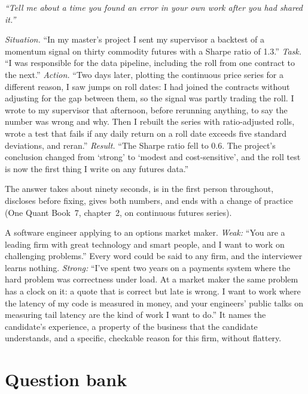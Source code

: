 \begin{example}\label{ex:iv:behavioural-and-fit:caught}
\emph{``Tell me about a time you found an error in your own work after you had shared it.''}

\emph{Situation.} ``In my master's project I sent my supervisor a backtest of a momentum signal on thirty commodity futures
with a Sharpe ratio of 1.3.'' \emph{Task.} ``I was responsible for the data pipeline, including the roll from one contract
to the next.'' \emph{Action.} ``Two days later, plotting the continuous price series for a different reason, I saw jumps on
roll dates: I had joined the contracts without adjusting for the gap between them, so the signal was partly trading the
roll. I wrote to my supervisor that afternoon, before rerunning anything, to say the number was wrong and why. Then I
rebuilt the series with ratio-adjusted rolls, wrote a test that fails if any daily return on a roll date exceeds five
standard deviations, and reran.'' \emph{Result.} ``The Sharpe ratio fell to 0.6. The project's conclusion changed from
`strong' to `modest and cost-sensitive', and the roll test is now the first thing I write on any futures data.''

The answer takes about ninety seconds, is in the first person throughout, discloses before fixing, gives both numbers, and
ends with a change of practice (One Quant Book~7, chapter~2, on continuous futures series).
\end{example}

\begin{example}\label{ex:iv:behavioural-and-fit:why}
A software engineer applying to an options market maker. \emph{Weak:} ``You are a leading firm with great technology and
smart people, and I want to work on challenging problems.'' Every word could be said to any firm, and the interviewer learns
nothing. \emph{Strong:} ``I've spent two years on a payments system where the hard problem was correctness under load. At a
market maker the same problem has a clock on it: a quote that is correct but late is wrong. I want to work where the latency
of my code is measured in money, and your engineers' public talks on measuring tail latency are the kind of work I want to
do.'' It names the candidate's experience, a property of the business that the candidate understands, and a specific,
checkable reason for this firm, without flattery.
\end{example}

\section{Question bank}

